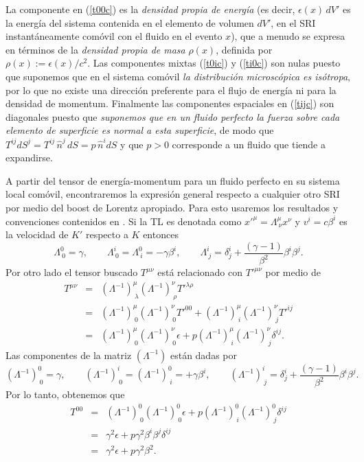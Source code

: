 La componente en (\ref{t00c}) es la \textit{densidad propia de energía} (es decir, $\epsilon(x)\,dV'$ es la energía del sistema contenida en el elemento de volumen $dV'$, en el SRI instantáneamente comóvil con el fluido en el evento $x$), que a menudo se expresa en términos de la \textit{densidad propia de masa} $\rho(x)$, definida por $\rho(x):=\epsilon(x)/c^2$. Las componentes
mixtas (\ref{t0ic}) y (\ref{ti0c}) son nulas puesto que suponemos que en el sistema comóvil \textit{la distribución microscópica es isótropa}, por lo que no existe una dirección preferente para el flujo de energía ni para la densidad de momentum. Finalmente las componentes espaciales
en (\ref{tijc}) son diagonales puesto que \textit{suponemos que en un fluido
perfecto la fuerza sobre cada elemento de superficie es normal a esta
superficie}, de modo que $T^{ij}dS^j=T^{ij}\,\hat{n}^j\,dS=p\,\hat{n}^i dS$ y que $p>0$ corresponde a un fluido que tiende a expandirse.

A partir del tensor de energía-momentum para un fluido perfecto en su sistema local comóvil, encontraremos la expresión general respecto a cualquier
otro SRI por medio del boost de Lorentz apropiado. Para esto usaremos los resultados y convenciones contenidos en \cite{7}. Si la TL es denotada como $x'^\mu=\Lambda^\mu_{\ \nu}x^\nu$ y $v^i=c\beta^i$ es la velocidad de $K'$ respecto a $K$ entonces
\begin{equation}
 \Lambda^0_{\ 0}=\gamma, \qquad \Lambda^i_{\ 0}=\Lambda^0_{\ i}=-\gamma\beta^i, \qquad \Lambda^i_{\ j}=\delta^i_j
+\frac{(\gamma-1) }{\beta^2}\beta^i\beta^j .
\end{equation}
Por otro lado el tensor buscado $T^{\mu\nu}$ está relacionado con $T'^{\mu\nu}$ por medio de
\begin{eqnarray}
T^{\mu\nu}&=&(\Lambda^{-1})^\mu_{\ \lambda}(\Lambda^{-1})^\nu_{\ \rho}T'^{\lambda\rho}
\\
&=& (\Lambda^{-1})^\mu_{\ 0}(\Lambda^{-1})^\nu_{\ 0}T'^{00}+(\Lambda^{-1})^\mu_{\
i}(\Lambda^{-1})^\nu_{\ j}T'^{ij}\\
&=& (\Lambda^{-1})^\mu_{\ 0}(\Lambda^{-1})^\nu_{\ 0}\epsilon+p(\Lambda^{-1})^\mu_{\
i}(\Lambda^{-1})^\nu_{\ j}\delta^{ij}.
\end{eqnarray}
Las componentes de la matriz $(\Lambda^{-1})$ están dadas por
\begin{equation}
(\Lambda^{-1})^0_{\ 0}=\gamma, \qquad (\Lambda^{-1})^i_{\ 0}=(\Lambda^{-1})^0_{\ i}=+\gamma\beta^i, \qquad (\Lambda^{-1})^i_{\ j}=\delta^i_j
+\frac{(\gamma-1) }{\beta^2}\beta^i\beta^j .
\end{equation}
Por lo tanto, obtenemos que
\begin{eqnarray}
T^{00}&=& (\Lambda^{-1})^0_{\ 0}(\Lambda^{-1})^0_{\ 0}\epsilon+p(\Lambda^{-1})^0_{\ i}(\Lambda^{-1})^0_{\ j}\delta^{ij} \\
&=& \gamma^2\epsilon+p\gamma^2\beta^i\beta^j\delta^{ij} \\
&=& \gamma^2\epsilon+p\gamma^2\beta^2 .
\end{eqnarray}

